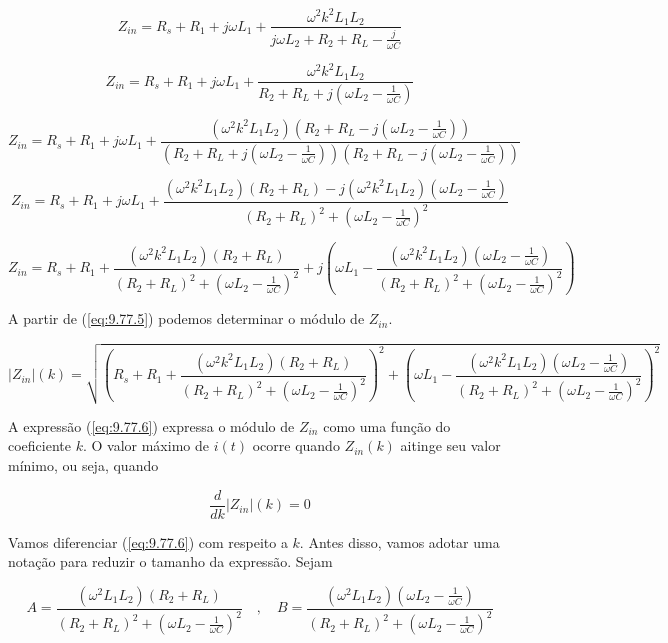 \[ Z_{in} = R_s + R_1 + j \omega L_1 + \frac{\omega^2k^2L_1L_2}{j\omega L_2 + R_2 + R_L - \frac{j}{\omega C}} \]

\[ Z_{in} = R_s + R_1 + j \omega L_1 + \frac{\omega^2k^2L_1L_2}{R_2 + R_L + j(\omega L_2 - \frac{1}{\omega C})} \]

\[ Z_{in} = R_s + R_1 + j \omega L_1 + \frac{(\omega^2k^2L_1L_2)(R_2 + R_L - j(\omega L_2 - \frac{1}{\omega C}))}{(R_2 + R_L + j(\omega L_2 - \frac{1}{\omega C}))(R_2 + R_L - j(\omega L_2 - \frac{1}{\omega C}))} \]

\[ Z_{in} = R_s + R_1 + j \omega L_1 + \frac{(\omega^2k^2L_1L_2)(R_2 + R_L) - j(\omega^2k^2L_1L_2)(\omega L_2 - \frac{1}{\omega C})}{(R_2 + R_L)^2 + (\omega L_2 - \frac{1}{\omega C})^2} \]

\begin{equation}\label{eq:9.77.5}
    Z_{in} = R_s + R_1 + \frac{(\omega^2k^2L_1L_2)(R_2 + R_L)}{(R_2 + R_L)^2 + (\omega L_2 - \frac{1}{\omega C})^2} + j \left(\omega L_1 - \frac{(\omega^2k^2L_1L_2)(\omega L_2 - \frac{1}{\omega C})}{(R_2 + R_L)^2 + (\omega L_2 - \frac{1}{\omega C})^2}\right)
\end{equation}

A partir de (\ref{eq:9.77.5}) podemos determinar o módulo de \(Z_{in}\).

\begin{equation}\label{eq:9.77.6}
    |Z_{in}|(k) = \sqrt{\left(R_s + R_1 + \frac{(\omega^2k^2L_1L_2)(R_2 + R_L)}{(R_2 + R_L)^2 + (\omega L_2 - \frac{1}{\omega C})^2}\right)^2 + \left(\omega L_1 - \frac{(\omega^2k^2L_1L_2)(\omega L_2 - \frac{1}{\omega C})}{(R_2 + R_L)^2 + (\omega L_2 - \frac{1}{\omega C})^2}\right)^2}
\end{equation}

A expressão (\ref{eq:9.77.6}) expressa o módulo de \(Z_{in}\) como uma função do coeficiente \(k\). O valor máximo de \(i(t)\) ocorre quando \(Z_{in}(k)\) aitinge seu valor mínimo, ou seja, quando

\begin{equation}\label{eq:9.77.7}
    \frac{d}{dk}|Z_{in}|(k) = 0
\end{equation}

Vamos diferenciar (\ref{eq:9.77.6}) com respeito a \(k\). Antes disso, vamos adotar uma notação para reduzir o tamanho da expressão.
Sejam

\[ 
    A = \frac{(\omega^2L_1L_2)(R_2 + R_L)}{(R_2 + R_L)^2 + (\omega L_2 - \frac{1}{\omega C})^2} 
    \quad , \quad
    B = \frac{(\omega^2L_1L_2)(\omega L_2 - \frac{1}{\omega C})}{(R_2 + R_L)^2 + (\omega L_2 - \frac{1}{\omega C})^2}
\]

